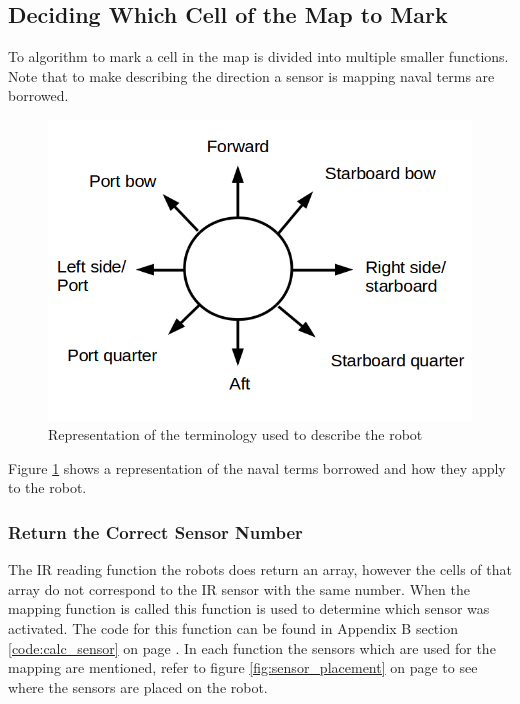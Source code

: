 \subsection{Deciding Which Cell of the Map to Mark}
To algorithm to mark a cell in the map is divided into multiple smaller functions.
Note that to make describing the direction a sensor is mapping naval terms are borrowed. \\

\begin{figure}[h]
\centering
\includegraphics[scale=0.5]{Chapter3/images/robot_terminology.png}
\caption{Representation of the terminology used to describe the robot}
\label{fig:robot_terminology}
\end{figure}

Figure \ref{fig:robot_terminology} shows a representation of the naval terms borrowed and how they apply to the robot. 

\subsubsection{Return the Correct Sensor Number}
\label{chap3:calc_sensor}
The IR reading function the robots does return an array, however the cells of that array do not correspond to the IR sensor with the same number. When the mapping function is called this function is used to determine which sensor was activated.
The code for this function can be found in Appendix B section \ref{code:calc_sensor} on page \pageref{code:calc_sensor}. In each function the sensors which are used for the mapping are mentioned, refer to figure \ref{fig:sensor_placement} on page \pageref{fig:sensor_placement} to see where the sensors are placed on the robot. 

